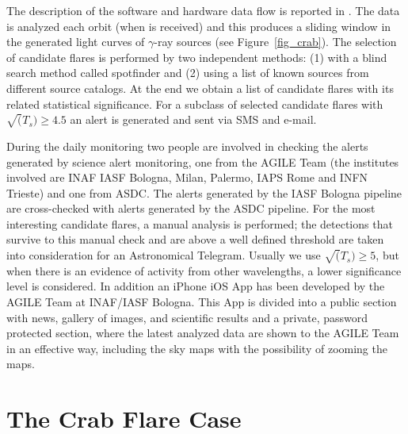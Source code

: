 The description of the software and hardware data flow is reported in \citep{2009ASPC..411..362B}. The data is analyzed each orbit (when is received) and this produces a sliding window in the generated light curves of $\gamma$-ray sources (see Figure~\ref{fig_crab}). The selection of candidate flares is performed by two independent methods: (1) with a blind search method called spotfinder and (2) using a list of known sources from different source catalogs. At the end we obtain a list of candidate flares with its related statistical significance. For a subclass of selected candidate flares with $\sqrt(T_s) \ge 4.5$ an alert is generated and sent via SMS and e-mail.

During the daily monitoring two people are involved in checking the alerts generated by science alert monitoring, one from the AGILE Team (the institutes involved are INAF IASF Bologna, Milan, Palermo, IAPS Rome and INFN Trieste) and one from ASDC. The alerts generated by the  IASF Bologna pipeline are cross-checked with alerts generated by the ASDC pipeline. For the most interesting candidate flares, a manual analysis is performed; the detections that survive to this manual check and are above a well defined threshold are taken into consideration for an Astronomical Telegram. Usually we use $\sqrt(T_s) \ge 5$, but when there is an evidence of activity from other wavelengths, a lower significance level is considered. In addition an iPhone iOS App has been developed by the AGILE Team at INAF/IASF Bologna. This App is divided into a public section with news, gallery of images, and scientific results and a private, password protected section, where the latest analyzed data are shown to the AGILE Team in an effective way, including the sky maps with the possibility of zooming the maps.
      
      
\section{The Crab Flare Case}

